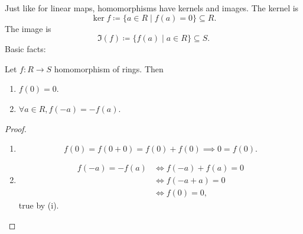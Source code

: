 \documentclass[10pt, a4paper]{article}
\begin{document}
Just like for linear maps,
homomorphisms have kernels and images.
The kernel is
\[
\ker{f} \coloneqq \{a \in R \mid f(a) = 0\} \subseteq R.
\]
The image is
\[
\Im(f) \coloneqq \{f(a) \mid a \in R\} \subseteq S.
\]
Basic facts:
\begin{lemma}\label{algII:lem:homobasicfacts}
    Let $f : R \to S$ homomorphism of rings.
    Then
    \begin{enumerate}[label = (\roman*)]
        \item $f(0) = 0$.

        \item $\forall a \in R, f(-a) = -f(a)$.
    \end{enumerate}

    \begin{proof}
        \begin{enumerate}[label = (\roman*)]
        \item
        \[
        f(0) = f(0 + 0) = f(0) + f(0) \implies 0 = f(0).
        \]
        
        \item
        \begin{align*}
            f(-a) = -f(a) &\iff f(-a) + f(a) = 0 \\
            &\iff f(-a + a) = 0 \\
            &\iff f(0) = 0,
        \end{align*}
        true by (i).
        \end{enumerate}
    \end{proof}
\end{lemma}
\end{document}
